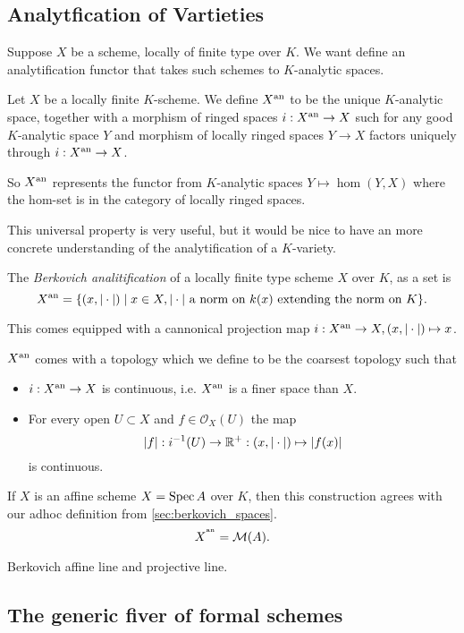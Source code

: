 
\subsection{Analytfication of Vartieties} \label{sec:analytfication_of_vartieties}


Suppose $X$ be a scheme, locally of finite type over $K$.  We want define an analytification functor that takes such schemes to $K$-analytic spaces.  
\begin{definition}
	Let  $X$ be a locally finite $K$-scheme. 
	We define $X{}^{\text{an}}$ to be the unique $K$-analytic space, together with a morphism of ringed spaces $i: X{}^{\text{an}} \to X$ such for any good $K$-analytic space $Y$ and morphism of locally ringed spaces $Y \to X$ factors uniquely through $i: X{}^{\text{an}} \to X$. 
\end{definition}
So $X{}^{\text{an}}$ represents the functor from $K$-analytic spaces $Y \mapsto \hom(Y, X)$ where the hom-set is in the category of locally ringed spaces. 

This universal property is very useful, but it would be nice to have an more concrete understanding of the analytification of a $K$-variety. 
\begin{definition}
	The \emph{Berkovich analitification} of a locally finite type scheme $X$ over  $K$, as a set is \[
		X{}^{\text{an}} = \{(x, |\cdot |)  \mid x\in X, |\cdot | \text{ a norm on } k(x) \text{ extending the norm on }K \} 
	.\] 

	This comes equipped with a cannonical projection map $i: X{}^{\text{an}} \to X, (x, |\cdot |) \mapsto  x$.
	
	$X{}^{\text{an}} $ comes with a topology which we define to be the coarsest topology such that 
	\begin{itemize}
		\item $i: X{}^{\text{an}} \to X$ is continuous, i.e. $X{}^{\text{an}}$ is a finer space than  $X$. 
		\item For every open $U \subset X$ and $f \in \mathcal{O}_X(U)$ the map  \[
				|f|: i^{-1}(U) \to \mathbb{R}^{+}: (x, |\cdot |) \mapsto  |f(x)|
		\] 
		is continuous.
	\end{itemize}

\end{definition}

\begin{remark}
	If $X$ is an affine scheme $X = \operatorname{Spec} A$ over $K$, then this construction agrees with our adhoc definition from \cref{sec:berkovich_spaces}.
	\[
		X^{{}^{\text{an}}} = \mathcal{M} (A)
	.\] 
\end{remark}


\begin{example}
	Berkovich affine line and projective line. 
\end{example}

\subsection{The generic fiver of formal schemes} \label{sec:the_generic_fiver_of_formal_schemes}



